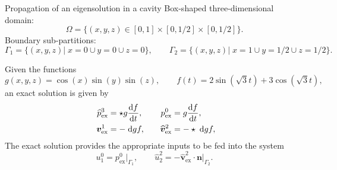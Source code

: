 \documentclass[aspectratio=169]{beamer}
\newcommand*{\dual}[1]{\ensuremath{\widehat{#1}}}
\begin{document}
	
	\begin{frame}{Propagation of an eigensolution in a cavity}
		Box-shaped three-dimensional domain:
		$$\Omega = \{ (x,y,z) \in [0, 1]\times[0, 1/2]\times[0, 1/2] \}.$$ 
		Boundary sub-partitions:
		\begin{equation*}
			\Gamma_1 = \{(x,y,z) \vert \; x=0 \cup y=0 \cup z=0\}, \qquad \Gamma_2 = \{(x, y, z) \vert \; x=1 \cup y=1/2 \cup z=1/2 \}.
		\end{equation*}
		
		Given the functions
		\begin{equation*}
			g(x, y, z) = \cos(x) \sin(y) \sin(z), \qquad f(t) = 2 \sin(\sqrt{3} t) + 3 \cos(\sqrt{3} t),
		\end{equation*}
		an exact solution  is given by
		\begin{equation*}\	\begin{aligned}
				\dual{p}^3_{\mathrm{ex}} &= \star g \diff{f}{t}, \\    
				\bm{v}^1_{\mathrm{ex}} &= -\d{g} f, 
			\end{aligned} \qquad 
			\begin{aligned}
				p^0_{\mathrm{ex}} &= g \diff{f}{t}, \\
				\dual{\bm{v}}^2_{\mathrm{ex}} &= -\star \d{g} f,
			\end{aligned}
		\end{equation*}
		The exact solution provides the appropriate inputs to be fed into the system
		\begin{equation*}
			u^0_1 =p^0_{\mathrm{ex}}|_{\Gamma_1}, \qquad \dual{u}^2_2 =  -\dual{\bm{v}}^2_{\mathrm{ex}} \cdot \bm{n}\vert_{\Gamma_2}.
		\end{equation*}
	\end{frame}
	
\end{document}
